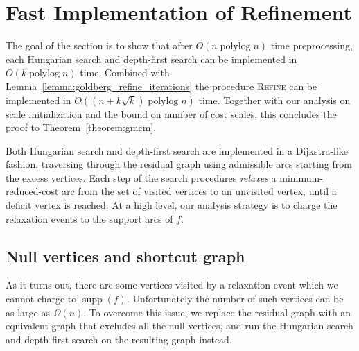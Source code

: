 \documentclass[a4paper,UKenglish]{socg-lipics-v2018}
\makeatletter
\def\polylog{\mathop{\mathrm{polylog}}}
\def\supp{\operatorname{supp}}
\theoremstyle{plain}
\numberwithin{figure}{section}
\def\EMPH#1{\textcolor{BrickRed}{{\emph{#1}}}}
\def\n@te#1{\textsf{\boldmath \textbf{$\langle\!\langle$#1$\rangle\!\rangle$}}\leavevmode}
\def\note#1{\textcolor{red}{\n@te{#1}}}
\renewcommand{\note}[1]{} %
\makeatother
\begin{document}
\section{Fast Implementation of Refinement}
\label{S:implementation}

The goal of the section is to show that after $O(n \polylog n)$ time preprocessing, each Hungarian search and depth-first search can be implemented in $O(k \polylog n)$ time.
%
Combined with Lemma~\ref{lemma:goldberg_refine_iterations}
the procedure \textsc{Refine} can be implemented in $O((n+k\sqrt{k}) \polylog n)$ time.  Together with our analysis on scale initialization and the bound on number of cost scales, this concludes the proof to Theorem~\ref{theorem:gmcm}.

Both Hungarian search and depth-first search are implemented in a Dijkstra-like fashion, traversing through the residual graph using admissible arcs starting from the excess vertices.
Each step of the search procedures \EMPH{relaxes} a minimum-reduced-cost arc from the set of visited vertices to an unvisited vertex, until a deficit vertex is reached.
%
At a high level, our analysis strategy is to charge the relaxation events to the support arcs of $f$.

\subsection{Null vertices and shortcut graph}


As it turns out, there are some vertices visited by a relaxation event which we cannot charge to $\supp(f)$.
Unfortunately the number of such vertices can be as large as $\Omega(n)$.
%
To overcome this issue, we replace the residual graph with an equivalent graph that excludes all the null vertices,
and run the Hungarian search and depth-first search on the resulting graph instead.
\end{document}
